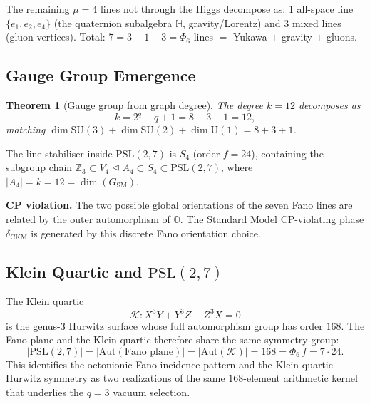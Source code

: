\documentclass[12pt,a4paper]{article}
\newtheorem{theorem}{Theorem}[section]
\begin{document}
The remaining $\mu=4$ lines not through the Higgs decompose as:
1 all-space line $\{e_1,e_2,e_4\}$ (the quaternion subalgebra $\mathbb{H}$,
gravity/Lorentz) and 3 mixed lines (gluon vertices).
Total: $7=3+1+3=\Phi_6$ lines $=$ Yukawa $+$ gravity $+$ gluons.

\subsection{Gauge Group Emergence}

\begin{theorem}[Gauge group from graph degree]\label{thm:gaugeemergence}
The degree $k=12$ decomposes as
\begin{equation}\label{eq:kdecomp}
  k = 2^q + q + 1 = 8+3+1 = 12,
\end{equation}
matching $\dim\mathrm{SU}(3)+\dim\mathrm{SU}(2)+\dim\mathrm{U}(1)=8+3+1$.
\end{theorem}

The line stabiliser inside $\mathrm{PSL}(2,7)$ is $S_4$ (order $f=24$),
containing the subgroup chain
$\mathbb{Z}_3\subset V_4\trianglelefteq A_4\subset S_4\subset\mathrm{PSL}(2,7)$,
where $|A_4|=k=12=\dim(G_{\mathrm{SM}})$.

\textbf{CP violation.} The two possible global orientations of the seven
Fano lines are related by the outer automorphism of $\mathbb{O}$.
The Standard Model CP-violating phase $\delta_{\mathrm{CKM}}$ is generated
by this discrete Fano orientation choice.

\subsection{Klein Quartic and \texorpdfstring{$\mathrm{PSL}(2,7)$}{PSL(2,7)}}

The Klein quartic
\[
  \mathcal{K}: X^3Y + Y^3Z + Z^3X = 0
\]
is the genus-$3$ Hurwitz surface whose full automorphism group has order
$168$. The Fano plane and the Klein quartic therefore share the same symmetry
group:
\begin{equation}\label{eq:klein-fano}
  |\mathrm{PSL}(2,7)|
  = |\mathrm{Aut}(\text{Fano plane})|
  = |\mathrm{Aut}(\mathcal{K})|
  = 168
  = \Phi_6\,f
  = 7\cdot 24.
\end{equation}
This identifies the octonionic Fano incidence pattern and the Klein quartic
Hurwitz symmetry as two realizations of the same $168$-element arithmetic
kernel that underlies the $q=3$ vacuum selection.


\end{document}

